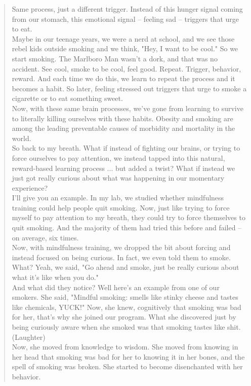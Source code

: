 \begin{quote}
Same process, just a different trigger. Instead of this hunger signal coming from our stomach, this emotional signal -- feeling sad -- triggers that urge to eat.\\
Maybe in our teenage years, we were a nerd at school, and we see those rebel kids outside smoking and we think, "Hey, I want to be cool." So we start smoking. The Marlboro Man wasn't a dork, and that was no accident. See cool, smoke to be cool, feel good. Repeat. Trigger, behavior, reward. And each time we do this, we learn to repeat the process and it becomes a habit. So later, feeling stressed out triggers that urge to smoke a cigarette or to eat something sweet.\\
Now, with these same brain processes, we've gone from learning to survive to literally killing ourselves with these habits. Obesity and smoking are among the leading preventable causes of morbidity and mortality in the world.\\
So back to my breath. What if instead of fighting our brains, or trying to force ourselves to pay attention, we instead tapped into this natural, reward-based learning process ... but added a twist? What if instead we just got really curious about what was happening in our momentary experience?\\
I'll give you an example. In my lab, we studied whether mindfulness training could help people quit smoking. Now, just like trying to force myself to pay attention to my breath, they could try to force themselves to quit smoking. And the majority of them had tried this before and failed -- on average, six times.\\
Now, with mindfulness training, we dropped the bit about forcing and instead focused on being curious. In fact, we even told them to smoke. What? Yeah, we said, "Go ahead and smoke, just be really curious about what it's like when you do."\\
And what did they notice? Well here's an example from one of our smokers. She said, "Mindful smoking: smells like stinky cheese and tastes like chemicals, YUCK!" Now, she knew, cognitively that smoking was bad for her, that's why she joined our program. What she discovered just by being curiously aware when she smoked was that smoking tastes like shit.\\
(Laughter)\\
Now, she moved from knowledge to wisdom. She moved from knowing in her head that smoking was bad for her to knowing it in her bones, and the spell of smoking was broken. She started to become disenchanted with her behavior.\\

\end{quote}
